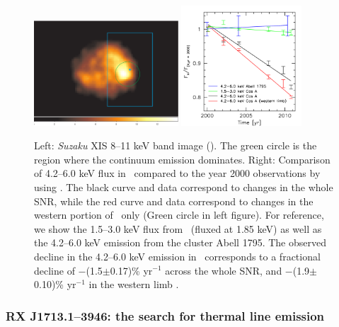 \documentclass[11pt,a4paper]{article}
\begin{document}
{\begin{figure}[h]
\begin{center}
\includegraphics[width=0.48\textwidth,clip,angle=0]{figure2d}
\includegraphics[width=0.4\textwidth,clip,angle=0]{f2}\\
\normalsize
\caption{ Left: {\it Suzaku} XIS 8--11 keV band
  image (\cite{Maeda09}). The green circle is the region where the
  continuum emission dominates.  Right: Comparison of 4.2--6.0 keV
  flux in \casa\ compared to the year 2000 observations by
  \citet{Patnaude11} using \chandra. The black curve and data
  correspond to changes in the whole SNR, while the red curve and data
  correspond to changes in the western portion of \casa\ only (Green
  circle in left figure).  For reference, we show the 1.5--3.0 keV flux from
  \casa\ (fluxed at 1.85 keV) as well as the 4.2--6.0 keV emission
  from the cluster Abell 1795. The observed decline in the 4.2--6.0
  keV emission in \casa\ corresponds to a fractional decline of
  $-$(1.5$\pm$0.17)\% yr$^{-1}$ across the whole SNR, and
  $-$(1.9$\pm$0.10)\% yr$^{-1}$ in the western limb
  \citep{Patnaude11}.  }
\label{fig:long}
\end{center}
\end{figure}


\subsubsection{RX J1713.1--3946: the search for thermal line emission} \label{subsec:rxjnontherm}


}
\end{document}
